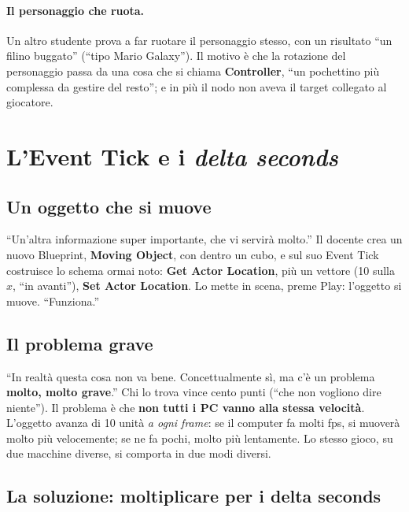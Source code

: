 \paragraph{Il personaggio che ruota.} Un altro studente prova a far ruotare il
personaggio stesso, con un risultato ``un filino buggato'' (``tipo Mario
Galaxy''). Il motivo è che la rotazione del personaggio passa da una cosa che
si chiama \textbf{Controller}, ``un pochettino più complessa da gestire del
resto''; e in più il nodo non aveva il target collegato al giocatore.

\section{L'Event Tick e i \emph{delta seconds}}
\label{gd7:sec:delta}

\subsection{Un oggetto che si muove}

``Un'altra informazione super importante, che vi servirà molto.'' Il docente
crea un nuovo Blueprint, \textbf{Moving Object}, con dentro un cubo, e sul suo
Event Tick costruisce lo schema ormai noto: \textbf{Get Actor Location}, più
un vettore (10 sulla $x$, ``in avanti''), \textbf{Set Actor Location}. Lo
mette in scena, preme Play: l'oggetto si muove. ``Funziona.''

\subsection{Il problema grave}

``In realtà questa cosa non va bene. Concettualmente sì, ma c'è un problema
\textbf{molto, molto grave}.'' Chi lo trova vince cento punti (``che non
vogliono dire niente''). Il problema è che \textbf{non tutti i PC vanno alla
stessa velocità}. L'oggetto avanza di 10 unità \emph{a ogni frame}: se il
computer fa molti fps, si muoverà molto più velocemente; se ne fa pochi,
molto più lentamente. Lo stesso gioco, su due macchine diverse, si comporta in
due modi diversi.

\subsection{La soluzione: moltiplicare per i delta seconds}

